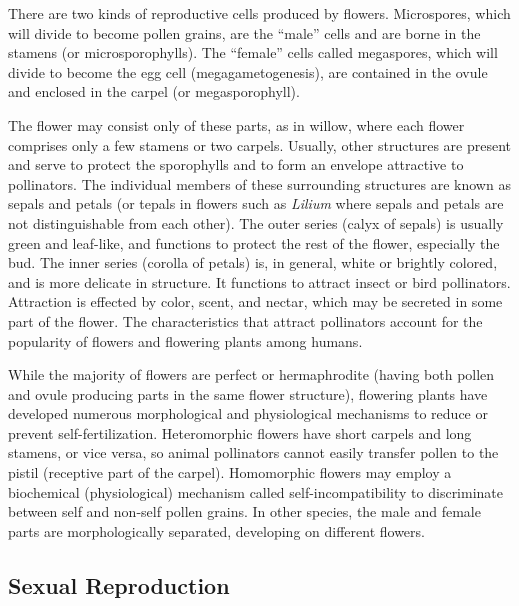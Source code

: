 \documentclass[]{book}
\begin{document}
There are two kinds of reproductive cells produced by flowers. Microspores, which will divide to become pollen grains, are the ``male'' cells and are borne in the stamens (or microsporophylls). The ``female'' cells called megaspores, which will divide to become the egg cell (megagametogenesis), are contained in the ovule and enclosed in the carpel (or megasporophyll).

The flower may consist only of these parts, as in willow, where each flower comprises only a few stamens or two carpels. Usually, other structures are present and serve to protect the sporophylls and to form an envelope attractive to pollinators. The individual members of these surrounding structures are known as sepals and petals (or tepals in flowers such as \emph{Lilium} where sepals and petals are not distinguishable from each other). The outer series (calyx of sepals) is usually green and leaf-like, and functions to protect the rest of the flower, especially the bud. The inner series (corolla of petals) is, in general, white or brightly colored, and is more delicate in structure. It functions to attract insect or bird pollinators. Attraction is effected by color, scent, and nectar, which may be secreted in some part of the flower. The characteristics that attract pollinators account for the popularity of flowers and flowering plants among humans.

While the majority of flowers are perfect or hermaphrodite (having both pollen and ovule producing parts in the same flower structure), flowering plants have developed numerous morphological and physiological mechanisms to reduce or prevent self-fertilization. Heteromorphic flowers have short carpels and long stamens, or vice versa, so animal pollinators cannot easily transfer pollen to the pistil (receptive part of the carpel). Homomorphic flowers may employ a biochemical (physiological) mechanism called self-incompatibility to discriminate between self and non-self pollen grains. In other species, the male and female parts are morphologically separated, developing on different flowers.

\hypertarget{sexual-reproduction}{%
\subsection{Sexual Reproduction}\label{sexual-reproduction}}
\end{document}
